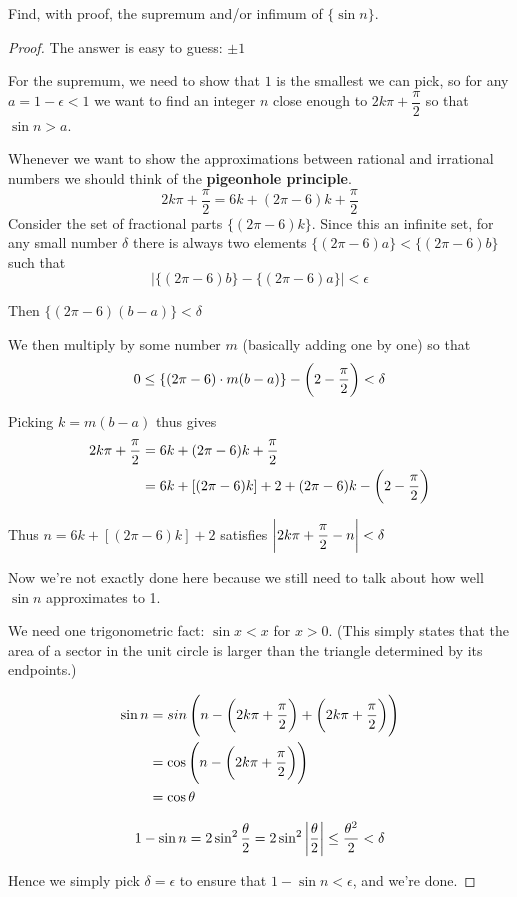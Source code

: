 \begin{prbm}
Find, with proof, the supremum and/or infimum of $\{\sin n\}$.
\end{prbm}

\begin{proof}
The answer is easy to guess: $\pm1$

For the supremum, we need to show that $1$ is the smallest we can pick, so for any $a=1-\epsilon<1$ we want to find an integer $n$ close enough to $2k\pi+\dfrac{\pi}{2}$ so that $\sin n > a$.

Whenever we want to show the approximations between rational and irrational numbers we should think of the \textbf{pigeonhole principle}.
\[ 2k\pi+\frac{\pi}{2}=6k+(2\pi-6)k+\frac{\pi}{2} \]
Consider the set of fractional parts $\{(2\pi-6)k\}$. Since this an infinite set, for any small number $\delta$ there is always two elements $\{(2\pi-6)a\}<\{(2\pi-6)b\}$ such that
\[ |\{(2\pi-6)b\}-\{(2\pi-6)a\}|<\epsilon \]

Then $\{(2\pi-6)(b-a)\}<\delta$

We then multiply by some number $m$ (basically adding one by one) so that
\[ 0 \le \{(2\pi-6)\cdot m(b-a)\}-\left(2-\frac{\pi}{2}\right)<\delta \]

Picking $k=m(b-a)$ thus gives
\begin{align*}
2k\pi+\frac{\pi}{2} &= 6k+(2\pi-6)k+\frac{\pi}{2} \\
&= 6k+[(2\pi-6)k]+2+{(2\pi-6)k}-\left(2-\frac{\pi}{2}\right)
\end{align*}

Thus $n=6k+[(2\pi-6)k]+2$ satisfies $\left|2k\pi+\dfrac{\pi}{2}-n\right|<\delta$

Now we're not exactly done here because we still need to talk about how well $\sin n$ approximates to 1.

We need one trigonometric fact: $\sin x<x$ for $x>0$. (This simply states that the area of a sector in the unit circle is larger than the triangle determined by its endpoints.)

\begin{align*}
\sin n &= sin\left(n-\left(2k\pi+\frac{\pi}{2}\right)+\left(2k\pi+\frac{\pi}{2}\right)\right) \\
&= \cos\left(n-\left(2k\pi+\frac{\pi}{2}\right)\right) \\
&= \cos\theta
\end{align*}

\[ 1 - \sin n = 2 \sin^2 \frac{\theta}{2} = 2 \sin^2 \left|\frac{\theta}{2}\right| \le \frac{\theta^2}{2}<\delta \]

Hence we simply pick $\delta=\epsilon$ to ensure that $1 - \sin n<\epsilon$, and we're done.
\end{proof}

